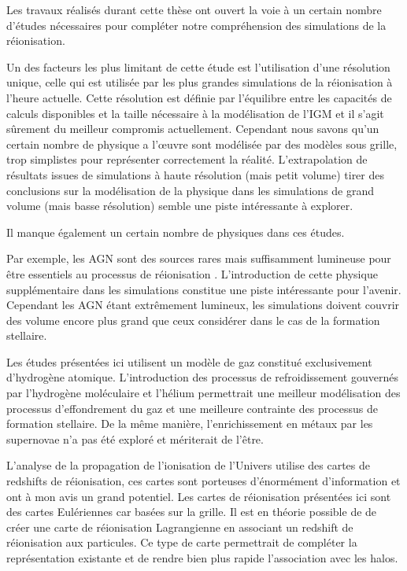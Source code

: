 Les travaux réalisés durant cette thèse ont ouvert la voie à un certain nombre d'études nécessaires pour compléter notre compréhension des simulations de la réionisation.

Un des facteurs les plus limitant de cette étude est l'utilisation d'une résolution unique, celle qui est utilisée par les plus grandes simulations de la réionisation à l'heure actuelle. 
Cette résolution est définie par l’équilibre entre les capacités de calculs disponibles et la taille nécessaire à la modélisation de l'\ac{IGM} et il s'agit sûrement du meilleur compromis actuellement.
Cependant nous savons qu'un certain nombre de physique a l’œuvre sont modélisée par des modèles sous grille, trop simplistes pour représenter correctement la réalité.
L'extrapolation de résultats issues de simulations à haute résolution (mais petit volume) tirer des conclusions sur la modélisation de la physique dans les simulations de grand volume (mais basse résolution) semble une piste intéressante à explorer.

Il manque également un certain nombre de physiques dans ces études.

Par exemple, les \ac{AGN} sont des sources rares mais suffisamment lumineuse pour être essentiels au processus de réionisation \citep{chardin_large-scale_2017}.
L'introduction de cette physique supplémentaire dans les simulations constitue une piste intéressante pour l'avenir.
Cependant les AGN étant extrêmement lumineux, les simulations doivent couvrir des volume encore plus grand que ceux considérer dans le cas de la formation stellaire.

Les études présentées ici utilisent un modèle de gaz constitué exclusivement d'hydrogène atomique.
L'introduction des processus de refroidissement gouvernés par l'hydrogène moléculaire et l'hélium permettrait une meilleur modélisation des processus d’effondrement du gaz et une meilleure contrainte des processus de formation stellaire.
De la même manière, l'enrichissement en métaux par les supernovae n'a pas été exploré et mériterait de l'être.

L'analyse de la propagation de l'ionisation de l'Univers utilise des cartes de redshifts de réionisation, ces cartes sont porteuses d'énormément d'information et ont à mon avis un grand potentiel.
Les cartes de réionisation présentées ici sont des cartes Eulériennes car basées sur la grille.
Il est en théorie possible de de créer une carte de réionisation Lagrangienne en associant un redshift de réionisation aux particules.
Ce type de carte permettrait de compléter la représentation existante et de rendre bien plus rapide l'association avec les halos.

